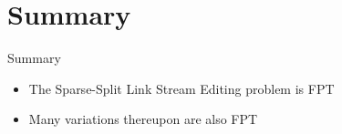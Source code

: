 \documentclass{beamer}
\begin{document}
\section*{Summary}

\begin{frame}{Summary}
  \begin{itemize}
  \item
    The Sparse-Split Link Stream Editing problem is FPT
  \item
    Many variations thereupon are also FPT
  \end{itemize}
\end{frame}
\end{document}
